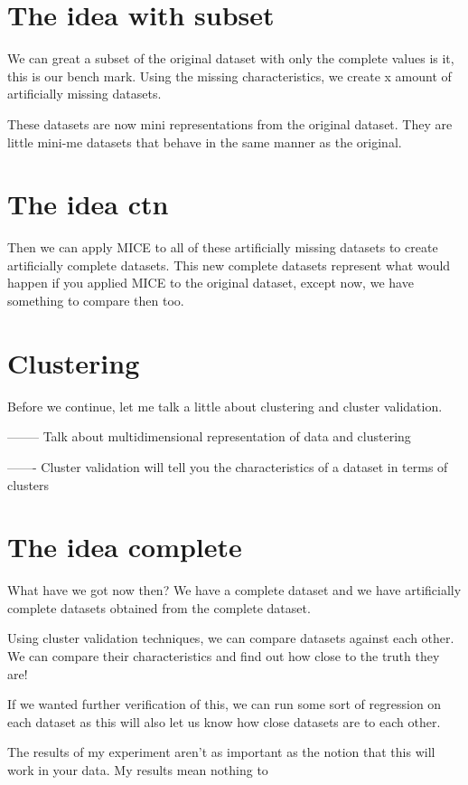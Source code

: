 \documentclass{report}
\begin{document}
\section*{The idea with subset}
We can great a subset of the original dataset with only the complete values is it, this is our bench mark. Using the missing characteristics, we create x amount of artificially missing datasets. 

These datasets are now mini representations from the original dataset. They are little mini-me datasets that behave in the same manner as the original. 

\section*{The idea ctn}
Then we can apply MICE to all of these artificially missing datasets to create artificially complete datasets. This new complete datasets represent what would happen if you applied MICE to the original dataset, except now, we have something to compare then too. 

\section*{Clustering}
Before we continue, let me talk a little about clustering and cluster validation. 

-------- Talk about multidimensional representation of data and clustering

------- Cluster validation will tell you the characteristics of a dataset in terms of clusters

\section*{The idea complete}
What have we got now then? We have a complete dataset and we have artificially complete datasets obtained from the complete dataset. 

Using cluster validation techniques, we can compare datasets against each other. We can compare their characteristics and find out how close to the truth they are! 

If we wanted further verification of this, we can run some sort of regression on each dataset as this will also let us know how close datasets are to each other. 

The results of my experiment aren't as important as the notion that this will work in your data. My results mean nothing to 
\end{document}
